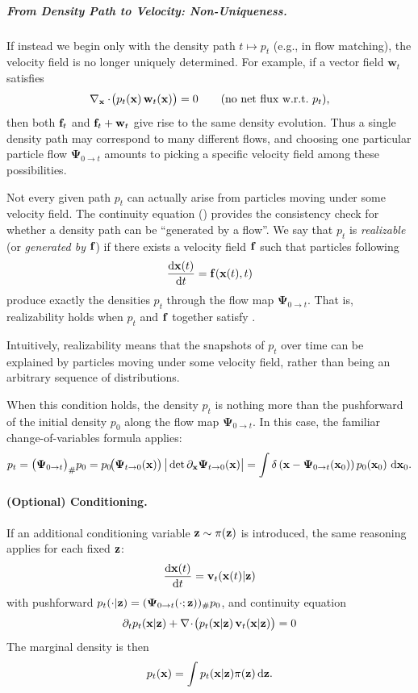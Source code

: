 \subparagraph{From Density Path to Velocity: Non-Uniqueness.}
If instead we begin only with the density path $t \mapsto p_t$ (e.g.,  in flow matching), the velocity field is no longer uniquely determined.  
For example, if a vector field $\mathbf w_t$ satisfies
\[
\nabla_{{\mathbf{x}}}\cdot\!\big(p_t({\mathbf{x}})\,\mathbf w_t({\mathbf{x}})\big)=0
\qquad\text{(no net flux w.r.t.\ $p_t$),}
\]
then both ${\mathbf{f}}_t$ and ${\mathbf{f}}_t+\mathbf w_t$ give rise to the same density evolution.  
Thus a single density path may correspond to many different flows, and choosing one particular particle flow $\bm{\Psi}_{0\to t}$ amounts to picking a specific velocity field among these possibilities.

Not every given path $p_t$ can actually arise from particles moving under some velocity field.  
The continuity equation () provides the consistency check for whether a density path can be ``generated by a flow''.  
We say that $p_t$ is \emph{realizable} (or \emph{generated by} ${\mathbf{f}}$) if there exists a velocity field ${\mathbf{f}}$ such that particles following
\[
\dfrac{\mathop{}\!\mathrm{d} {\mathbf{x}}(t)}{\mathop{}\!\mathrm{d} t} = {\mathbf{f}}({\mathbf{x}}(t), t)
\]
produce exactly the densities $p_t$ through the flow map $\bm{\Psi}_{0\to t}$.  That is, realizability holds when $p_t$ and ${\mathbf{f}}$ together satisfy .

Intuitively, realizability means that the snapshots of $p_t$ over time can be explained by particles moving under some velocity field, rather than being an arbitrary sequence of distributions.  



When this condition holds, the density $p_t$ is nothing more than the pushforward of the initial density $p_0$ along the flow map $\bm{\Psi}_{0\to t}$.  
In this case, the familiar change-of-variables formula applies:
\begin{align*}
    p_t = \big(\bm{\Psi}_{0\to t}\big)_{\#} p_0 
= p_0\!\big(\bm{\Psi}_{t\to 0}({\mathbf{x}})\big)\,
   \big|\det \partial_{\mathbf{x}}\bm{\Psi}_{t\to 0}({\mathbf{x}})\big|
= \int \delta \left({\mathbf{x}} - \bm{\Psi}_{0\to t}({\mathbf{x}}_0)\right) 
   p_0({\mathbf{x}}_0)\,\mathop{}\!\mathrm{d}{\mathbf{x}}_0.
\end{align*}




\paragraph{(Optional) Conditioning.}
If an additional conditioning variable ${\mathbf{z}} \sim \pi({\mathbf{z}})$ is introduced, the same reasoning applies for each fixed ${\mathbf{z}}$:
\[
\frac{\mathop{}\!\mathrm{d} {\mathbf{x}}(t)}{\mathop{}\!\mathrm{d} t}={\mathbf{v}}_t({\mathbf{x}}(t)|{\mathbf{z}})
\]
with pushforward $p_t(\cdot|{\mathbf{z}})=({\bm{\Psi}}_{0\to t}(\cdot;{\mathbf{z}}))_{\#}p_0$, and continuity equation
\[
\partial_t p_t({\mathbf{x}}|{\mathbf{z}})+\nabla\!\cdot\!\big(p_t({\mathbf{x}}|{\mathbf{z}})\,{\mathbf{v}}_t({\mathbf{x}}|{\mathbf{z}})\big)=0
\]
The marginal density is then 
\[
p_t({\mathbf{x}})=\int p_t({\mathbf{x}}|{\mathbf{z}})\pi({\mathbf{z}})\mathop{}\!\mathrm{d}{\mathbf{z}}.
\]





